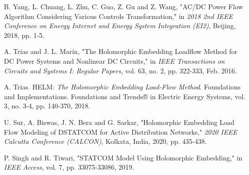 \documentclass[conference]{IEEEtran}
\begin{document}
\begin{thebibliography}{1}
B. Yang, L. Chuang, L. Zhu, C. Guo, Z. Gu and Z. Wang, "AC/DC Power Flow Algorithm Considering Various Controls Transformation," in \emph{2018 2nd IEEE Conference on Energy Internet and Energy System Integration (EI2)}, Beijing, 2018, pp. 1-5.

A. Trias and J. L. Marín, "The Holomorphic Embedding Loadflow Method for DC Power Systems and Nonlinear DC Circuits," in \emph{IEEE Transactions on Circuits and Systems I: Regular Papers}, vol. 63, no. 2, pp. 322-333, Feb. 2016.

A. Trias. HELM: \emph{The Holomorphic Embedding Load-Flow Method}. Foundations and Implementations. Foundations and Trends® in Electric Energy Systems, vol. 3, no. 3-4, pp. 140-370, 2018.

U. Sur, A. Biswas, J. N. Bera and G. Sarkar, "Holomorphic Embedding Load Flow Modeling of DSTATCOM for Active Distribution Networks," \emph{2020 IEEE Calcutta Conference (CALCON)}, Kolkata, India, 2020, pp. 435-438.

P. Singh and R. Tiwari, "STATCOM Model Using Holomorphic Embedding," in \emph{IEEE Access}, vol. 7, pp. 33075-33086, 2019.


\end{thebibliography}




\end{document}
